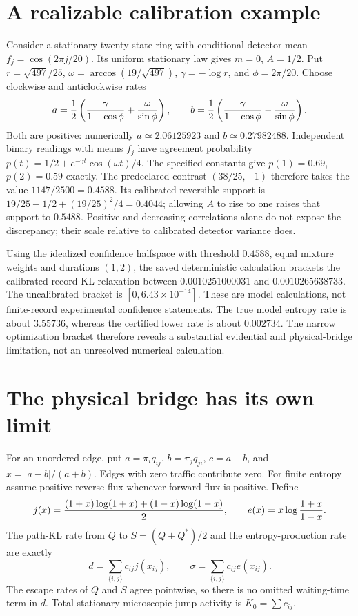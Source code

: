 \section{A realizable calibration example}
Consider a stationary twenty-state ring with conditional detector mean
$f_j=\cos(2\pi j/20)$. Its uniform stationary law gives $m=0$, $A=1/2$.
Put $r=\sqrt{497}/25$, $\omega=\arccos(19/\sqrt{497})$,
$\gamma=-\log r$, and $\phi=2\pi/20$. Choose clockwise and anticlockwise
rates
\[
 a={1\over2}\left({\gamma\over1-\cos\phi}
                   +{\omega\over\sin\phi}\right),\qquad
 b={1\over2}\left({\gamma\over1-\cos\phi}
                   -{\omega\over\sin\phi}\right).
\]
Both are positive: numerically $a\simeq2.06125923$ and $b\simeq0.27982488$.
Independent binary readings with means $f_j$ have agreement probability
$p(t)=1/2+e^{-\gamma t}\cos(\omega t)/4$. The specified constants give
$p(1)=0.69$, $p(2)=0.59$ exactly. The predeclared contrast
$(38/25,-1)$ therefore takes the value $1147/2500=0.4588$.
Its calibrated reversible support is
$19/25-1/2+(19/25)^2/4=0.4044$; allowing $A$ to rise to one raises
that support to $0.5488$. Positive and decreasing correlations alone do not
expose the discrepancy; their scale relative to calibrated detector variance
does.

Using the idealized confidence halfspace with threshold $0.4588$, equal
mixture weights and durations $(1,2)$, the saved deterministic calculation
brackets the calibrated record-KL relaxation between
$0.0010251000031$ and $0.0010265638733$. The uncalibrated bracket is
$[0,6.43\times10^{-14}]$. These are model calculations, not finite-record
experimental confidence statements. The true model entropy rate is about
$3.55736$, whereas the certified lower rate is about $0.002734$.
The narrow optimization bracket therefore reveals a substantial evidential
and physical-bridge limitation, not an unresolved numerical calculation.

\section{The physical bridge has its own limit}
For an unordered edge, put
$a=\pi_iq_{ij}$, $b=\pi_jq_{ji}$, $c=a+b$, and
$x=|a-b|/(a+b)$. Edges with zero traffic contribute zero. For finite entropy
assume positive reverse flux whenever forward flux is positive. Define
\[
 j(x)={ (1+x)\log(1+x)+(1-x)\log(1-x)\over2},
 \qquad e(x)=x\log{1+x\over1-x}.
\]
The path-KL rate from $Q$ to $S=(Q+Q^*)/2$ and the entropy-production rate are
exactly
\[
 d=\sum_{\{i,j\}}c_{ij}j(x_{ij}),\qquad
 \sigma=\sum_{\{i,j\}}c_{ij}e(x_{ij}).
\]
The escape rates of $Q$ and $S$ agree pointwise, so there is no omitted
waiting-time term in $d$. Total stationary microscopic jump activity is
$K_0=\sum c_{ij}$.

